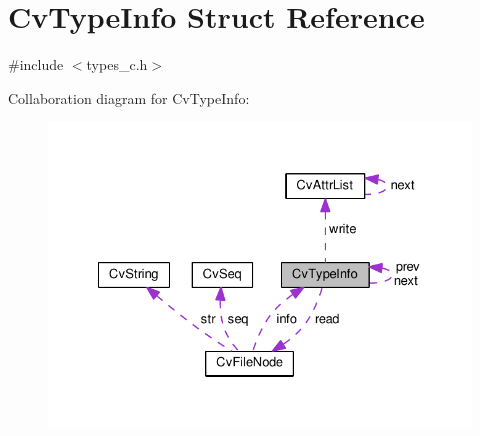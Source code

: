 \hypertarget{structCvTypeInfo}{\section{Cv\-Type\-Info Struct Reference}
\label{structCvTypeInfo}
}


{\ttfamily \#include $<$types\-\_\-c.\-h$>$}



Collaboration diagram for Cv\-Type\-Info\-:\nopagebreak
\begin{figure}[H]
\begin{center}
\leavevmode
\includegraphics[width=330pt]{structCvTypeInfo__coll__graph}
\end{center}
\end{figure}
